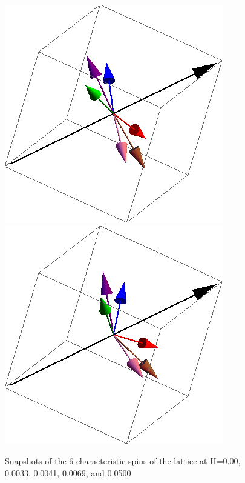 \documentclass{article}
\begin{document}
\begin{figure}[ht]
\includegraphics[scale=0.3]{111_3000/069S000to005R.png}
\includegraphics[scale=0.3]{111_3000/501S000to005R.png}
\caption{Snapshots of the 6 characteristic spins of the lattice at H=0.00, 0.0033, 0.0041, 0.0069, and 0.0500}
\end{figure}
\clearpage
\end{document}
